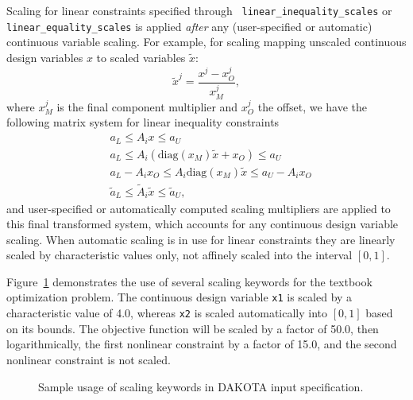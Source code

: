 Scaling for linear constraints specified through {\tt
linear\_inequality\_scales} or {\tt linear\_equality\_scales} is
applied {\em after} any (user-specified or automatic) continuous
variable scaling.  For example, for scaling mapping unscaled
continuous design variables $x$ to scaled variables $\tilde{x}$:
\[ \tilde{x}^j = \frac{x^j - x^j_O}{x^j_M}, \]
where $x^j_M$ is the final component multiplier and $x^j_O$ the
offset, we have the following matrix system for linear inequality
constraints
\begin{eqnarray*}
& a_L \leq A_i x \leq a_U \\
& a_L \leq A_i \left( \mathrm{diag}(x_M) \tilde{x} + x_O \right) \leq a_U \\
& a_L - A_i x_O \leq A_i \mathrm{diag}(x_M) \tilde{x} \leq a_U - A_i x_O \\
& \tilde{a}_L \leq \tilde{A}_i \tilde{x} \leq \tilde{a}_U,
\end{eqnarray*}
and user-specified or automatically computed scaling multipliers are
applied to this final transformed system, which accounts for any
continuous design variable scaling.  When automatic scaling is in use
for linear constraints they are linearly scaled by characteristic
values only, not affinely scaled into the interval $[0,1]$.

Figure~\ref{opt:additional:scaling:figure01} demonstrates the use of
several scaling keywords for the textbook optimization problem.  The
continuous design variable {\tt x1} is scaled by a characteristic
value of 4.0, whereas {\tt x2} is scaled automatically into $[0,1]$
based on its bounds.  The objective function will be scaled by a
factor of 50.0, then logarithmically, the first nonlinear constraint
by a factor of 15.0, and the second nonlinear constraint is not
scaled.

\begin{figure}
\centering
\begin{bigbox}
\begin{small}
\end{small}
\end{bigbox}
\caption{Sample usage of scaling keywords in DAKOTA input specification.}
\label{opt:additional:scaling:figure01}
\end{figure}
